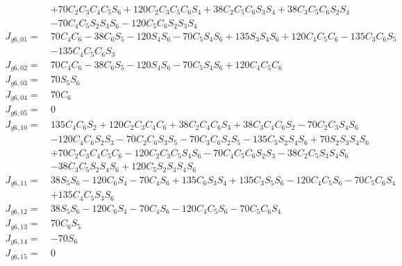 \documentclass[12pt]{article}
\begin{document}
\begin{CJK}{UTF8}{bsmi}
\begin{equation*}
\begin{split}
			  &+ 70C_2C_3C_4C_5S_6 + 120C_2C_3C_5C_6S_4 + 38C_2C_5C_6S_3S_4 + 38C_3C_5C_6S_2S_4\\
			  &- 70C_4C_5S_2S_3S_6 - 120C_5C_6S_2S_3S_4\\
J_{g6,01} =\  &70C_4C_6 - 38C_6S_5 - 120S_4S_6 - 70C_5S_4S_6 + 135S_3S_4S_6 + 120C_4C_5C_6 - 135C_3C_6S_5\\
			  &- 135C_4C_5C_6S_3\\   
J_{g6,02} =\  &70C_4C_6 - 38C_6S_5 - 120S_4S_6 - 70C_5S_4S_6 + 120C_4C_5C_6\\
J_{g6,03} =\  &70S_5S_6\\
J_{g6,04} =\  &70C_6\\
J_{g6,05} =\  &0\\
J_{g6,10} =\  &135C_4C_6S_2 + 120C_2C_3C_4C_6 + 38C_2C_4C_6S_3 + 38C_3C_4C_6S_2 - 70C_2C_3S_4S_6\\
			  & - 120C_4C_6S_2S_3 - 70C_2C_6S_3S_5 - 70C_3C_6S_2S_5 - 135C_5S_2S_4S_6 + 70S_2S_3S_4S_6\\
			  & + 70C_2C_3C_4C_5C_6 - 120C_2C_3C_5S_4S_6 - 70C_4C_5C_6S_2S_3 - 38C_2C_5S_3S_4S_6\\
			  & - 38C_3C_5S_2S_4S_6 + 120C_5S_2S_3S_4S_6\\
J_{g6,11} =\  &38S_5S_6 - 120C_6S_4 - 70C_4S_6 + 135C_6S_3S_4 + 135C_3S_5S_6 - 120C_4C_5S_6 - 70C_5C_6S_4\\
			  & + 135C_4C_5S_3S_6\\
J_{g6,12} =\  &38S_5S_6 - 120C_6S_4 - 70C_4S_6 - 120C_4C_5S_6 - 70C_5C_6S_4\\
J_{g6,13} =\  &70C_6S_5\\
J_{g6,14} =\  &-70S_6\\
J_{g6,15} =\  &0\\
\end{split}
\end{equation*}


\end{CJK}
\end{document}
